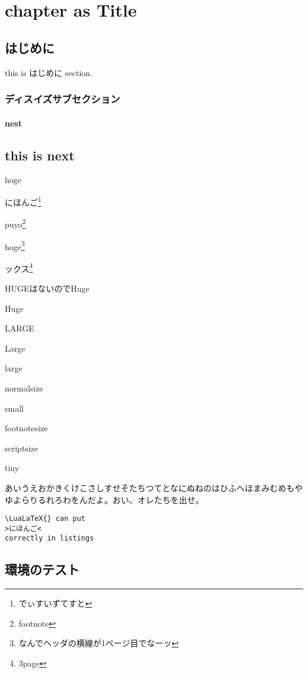 \documentclass{word}
\author{WORD太郎}
\subtitle{subtitleだぴょん}
\begin{document}
\chapter{chapter as Title}

\section{はじめに}
this is はじめに section.

\subsection{ディスイズサブセクション}

\subsubsection{nest}

\section{this is next}

hoge

にほんご\footnote{でぃすいずてすと}

puyo\footnote{footnote}

hoge\footnote{なんでヘッダの横線が1ページ目でなーッ}

ックス\footnote{3page}

{\Huge HUGEはないのでHuge}

{\Huge Huge}

{\LARGE LARGE}

{\Large Large}

{\large large}

{\normalsize normalsize}

{\small small}

{\footnotesize footnotesize}

{\scriptsize scriptsize}

{\tiny tiny}

あいうえおかきくけこさしすせそたちつてとなにぬねのはひふへほまみむめもやゆよらりるれろわをんだよ。おい、オレたちを出せ。

\lstset{language=TeX,numbers=left}
\begin{lstlisting}
\LuaLaTeX{} can put
>にほんご<
correctly in listings
\end{lstlisting}

% 

\section{環境のテスト}
\end{document}
